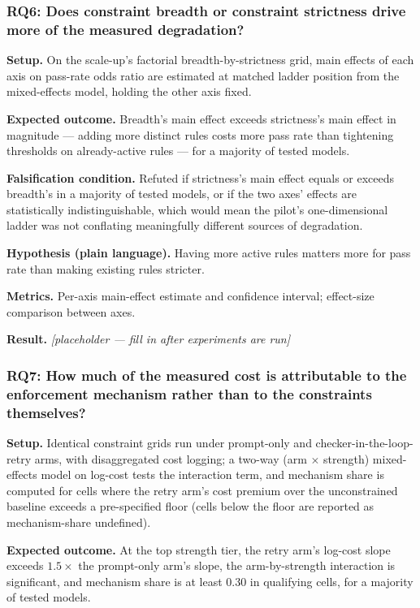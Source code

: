 \documentclass[11pt]{article}
\newcommand{\ph}{\textit{[placeholder --- fill in after experiments are run]}}
\begin{document}
\subsubsection{RQ6: Does constraint breadth or constraint strictness drive more of the measured degradation?}
\textbf{Setup.} On the scale-up's factorial breadth-by-strictness grid, main effects of each axis on pass-rate odds ratio are estimated at matched ladder position from the mixed-effects model, holding the other axis fixed.

\textbf{Expected outcome.} Breadth's main effect exceeds strictness's main effect in magnitude --- adding more distinct rules costs more pass rate than tightening thresholds on already-active rules --- for a majority of tested models.

\textbf{Falsification condition.} Refuted if strictness's main effect equals or exceeds breadth's in a majority of tested models, or if the two axes' effects are statistically indistinguishable, which would mean the pilot's one-dimensional ladder was not conflating meaningfully different sources of degradation.

\textbf{Hypothesis (plain language).} Having more active rules matters more for pass rate than making existing rules stricter.

\textbf{Metrics.} Per-axis main-effect estimate and confidence interval; effect-size comparison between axes.

\textbf{Result.} \ph

\subsubsection{RQ7: How much of the measured cost is attributable to the enforcement mechanism rather than to the constraints themselves?}
\textbf{Setup.} Identical constraint grids run under prompt-only and checker-in-the-loop-retry arms, with disaggregated cost logging; a two-way (arm $\times$ strength) mixed-effects model on log-cost tests the interaction term, and mechanism share is computed for cells where the retry arm's cost premium over the unconstrained baseline exceeds a pre-specified floor (cells below the floor are reported as mechanism-share undefined).

\textbf{Expected outcome.} At the top strength tier, the retry arm's log-cost slope exceeds $1.5\times$ the prompt-only arm's slope, the arm-by-strength interaction is significant, and mechanism share is at least 0.30 in qualifying cells, for a majority of tested models.
\end{document}
